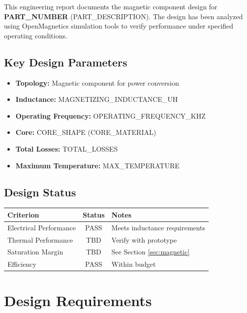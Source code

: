 \documentclass[11pt,a4paper]{article}
\begin{document}
This engineering report documents the magnetic component design for \textbf{{{PART_NUMBER}}} ({{PART_DESCRIPTION}}). The design has been analyzed using OpenMagnetics simulation tools to verify performance under specified operating conditions.

\subsection{Key Design Parameters}
\begin{itemize}
    \item \textbf{Topology:} Magnetic component for power conversion
    \item \textbf{Inductance:} {{MAGNETIZING_INDUCTANCE_UH}}
    \item \textbf{Operating Frequency:} {{OPERATING_FREQUENCY_KHZ}}
    \item \textbf{Core:} {{CORE_SHAPE}} ({{CORE_MATERIAL}})
    \item \textbf{Total Losses:} {{TOTAL_LOSSES}}
    \item \textbf{Maximum Temperature:} {{MAX_TEMPERATURE}}
\end{itemize}

\subsection{Design Status}
\begin{center}
\begin{tabular}{|l|c|l|}
\hline
\textbf{Criterion} & \textbf{Status} & \textbf{Notes} \\
\hline
Electrical Performance & \textcolor{successgreen}{PASS} & Meets inductance requirements \\
\hline
Thermal Performance & TBD & Verify with prototype \\
\hline
Saturation Margin & TBD & See Section \ref{sec:magnetic} \\
\hline
Efficiency & \textcolor{successgreen}{PASS} & Within budget \\
\hline
\end{tabular}
\end{center}

\section{Design Requirements}
\end{document}
